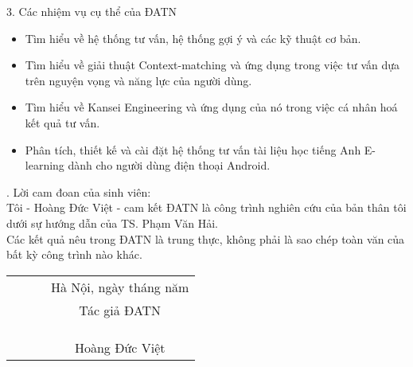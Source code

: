 \begin{acknowledgementslong}
3. Các nhiệm vụ cụ thể của ĐATN \\
\begin{itemize}
\item Tìm hiểu về hệ thống tư vấn, hệ thống gợi ý và các kỹ thuật cơ bản.
\item Tìm hiểu về giải thuật Context-matching và ứng dụng trong việc tư vấn dựa trên nguyện vọng và năng lực của người dùng.
\item Tìm hiểu về Kansei Engineering và ứng dụng của nó trong việc cá nhân hoá kết quả tư vấn.
\item Phân tích, thiết kế và cài đặt hệ thống tư vấn tài liệu học tiếng Anh E-learning dành cho người dùng điện thoại Android.
\end{itemize}
. Lời cam đoan của sinh viên:\\
Tôi - Hoàng Đức Việt - cam kết ĐATN là công trình nghiên cứu của bản thân tôi dưới sự hướng dẫn của TS. Phạm Văn Hải. \\
Các kết quả nêu trong ĐATN là trung thực, không phải là sao chép toàn văn của bất kỳ công trình nào khác.\\
\begin{tabular}{l l l c }
    \textbf{ } \hspace*{35pt} \textbf{ } &  \textbf{ } \hspace*{35pt} \textbf{ } & \textbf{ } \hspace*{35pt} \textbf{ } & Hà Nội, ngày \textbf{  } tháng \textbf{  } năm \textbf{    } \\ 
    \textbf{ } \hspace*{35pt} \textbf{ } &  \textbf{ } \hspace*{35pt} \textbf{ } & \textbf{ } \hspace*{35pt} \textbf{ } & Tác giả ĐATN \\
    \\
    \\
    \\
    \textbf{ } \hspace*{35pt} \textbf{ } &  \textbf{ } \hspace*{35pt} \textbf{ } & \textbf{ } \hspace*{35pt} \textbf{ } & Hoàng Đức Việt
    \end{tabular}\\
    

\end{acknowledgementslong}
